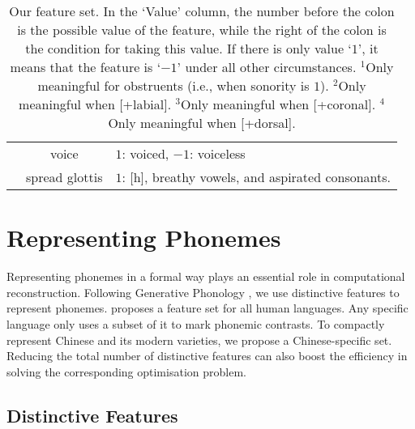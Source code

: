 \begin{table*}[!t]
{\begin{tabular}{@{}c@{}cl}
    \midrule
     & voice & $1$: voiced, $-1$: voiceless \\
          & spread glottis & $1$: [h], breathy vowels, and aspirated consonants. \\
    \bottomrule
  \end{tabular}
  }
  \caption{\label{table:feature-set}Our feature set.
    In the `Value' column, the number before the colon is the possible value of the feature, while the right of the colon is the condition for taking this value. 
    If there is only value `$1$', it means that the feature is `$-1$' under all other circumstances. 
    $^1$Only meaningful for obstruents (i.e., when sonority is $1$).
    $^2$Only meaningful when [+labial].
    $^3$Only meaningful when [+coronal].
    $^4$Only meaningful when [+dorsal].
    } 
\end{table*}

\section{Representing Phonemes} \label{sec:feature-set}
Representing phonemes in a formal way plays an essential role in computational reconstruction.
Following Generative Phonology \cite{chomsky-1968}, we use distinctive features to represent phonemes. 
\citet{hayes2011} proposes a feature set for all human languages.
Any specific language only uses a subset of it to mark phonemic contrasts. 
To compactly represent Chinese and its modern varieties, we propose a Chinese-specific set. 
Reducing the total number of distinctive features can also boost the efficiency in solving the corresponding optimisation problem. %

\subsection{Distinctive Features} \label{intro-gp}

